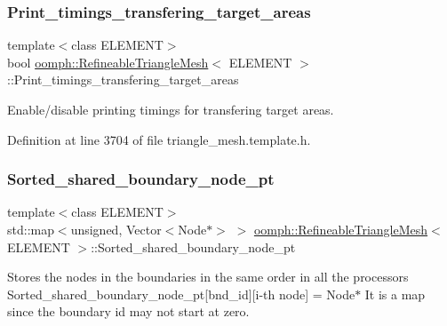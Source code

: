 \subsubsection{\texorpdfstring{Print\+\_\+timings\+\_\+transfering\+\_\+target\+\_\+areas}{Print\_timings\_transfering\_target\_areas}}
{\footnotesize\ttfamily template$<$class E\+L\+E\+M\+E\+NT$>$ \\
bool \hyperlink{classoomph_1_1RefineableTriangleMesh}{oomph\+::\+Refineable\+Triangle\+Mesh}$<$ E\+L\+E\+M\+E\+NT $>$\+::Print\+\_\+timings\+\_\+transfering\+\_\+target\+\_\+areas\hspace{0.3cm}{\ttfamily [protected]}}



Enable/disable printing timings for transfering target areas. 



Definition at line 3704 of file triangle\+\_\+mesh.\+template.\+h.

\mbox{\label{classoomph_1_1RefineableTriangleMesh_ab22bada72171b4403ce2424a3f36b0d3}} 
\subsubsection{\texorpdfstring{Sorted\+\_\+shared\+\_\+boundary\+\_\+node\+\_\+pt}{Sorted\_shared\_boundary\_node\_pt}}
{\footnotesize\ttfamily template$<$class E\+L\+E\+M\+E\+NT$>$ \\
std\+::map$<$unsigned, Vector$<$Node$\ast$$>$ $>$ \hyperlink{classoomph_1_1RefineableTriangleMesh}{oomph\+::\+Refineable\+Triangle\+Mesh}$<$ E\+L\+E\+M\+E\+NT $>$\+::Sorted\+\_\+shared\+\_\+boundary\+\_\+node\+\_\+pt\hspace{0.3cm}{\ttfamily [protected]}}



Stores the nodes in the boundaries in the same order in all the processors Sorted\+\_\+shared\+\_\+boundary\+\_\+node\+\_\+pt\mbox{[}bnd\+\_\+id\mbox{]}\mbox{[}i-\/th node\mbox{]} = Node$\ast$ It is a map since the boundary id may not start at zero. 



